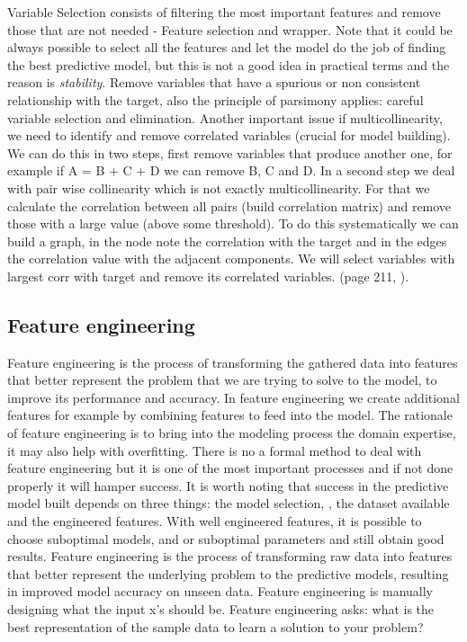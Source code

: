 \documentclass[12pt]{report}
\begin{document}
Variable Selection consists of filtering the most important features and remove those that are not needed - Feature selection and wrapper.
Note that it could be always possible to select all the features and let the model do the job of finding the best predictive model, but this is not a good idea in practical terms and the reason is \emph{stability}. Remove variables that have a spurious or non consistent relationship with the target, also the principle of parsimony applies: careful variable selection and elimination.
Another important issue if multicollinearity, we need to identify and remove correlated variables (crucial for model building). We can do this in two steps, first remove variables that produce another one, for example if A = B + C + D we can remove B, C and D.
In a second step we deal with pair wise collinearity which is not exactly multicollinearity. For that we calculate the correlation between all pairs (build correlation matrix) and remove those with a large value (above some threshold). To do this systematically we can build a graph, in the node note the correlation with the target and in the edges the correlation value with the adjacent components. We will select variables with largest corr with target and remove its correlated variables. (page 211, \cite{wu2012foundations}).


\subsection{Feature engineering}
Feature engineering is the process of transforming the gathered data into features that better represent the problem that we are trying to solve to the model, to improve its performance and accuracy. In feature engineering we create additional features for example by combining features to feed into the model. The rationale of feature engineering is to bring into the modeling process the domain expertise, it may also help with overfitting. 
There is no a formal method to deal with feature engineering but it is one of the most important processes and if not done properly it will hamper success. It is worth noting that success in the predictive model built depends on three things: the model selection, , the dataset available and the engineered features. With well engineered features, it is possible to choose suboptimal models, and or suboptimal parameters and still obtain good results. Feature engineering is the process of transforming raw data into features that better represent the underlying problem to the predictive models, resulting in improved model accuracy on unseen data. Feature engineering is manually designing what the input x’s should be. Feature engineering asks: what is the best representation of the sample data to learn a solution to your problem?
\end{document}
